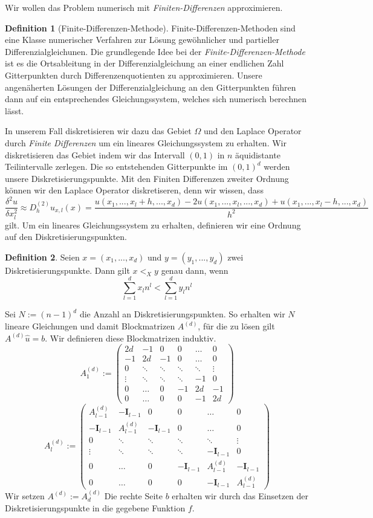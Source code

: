 \documentclass[smallheadings]{scrartcl}
\theoremstyle{definition}
\newtheorem{definition}{Definition}[section]
\begin{document}
		Wir wollen das Problem numerisch mit \textit{Finiten-Differenzen} approximieren.
		\begin{definition}[Finite-Differenzen-Methode]
		Finite-Differenzen-Methoden sind eine Klasse numerischer Verfahren zur Lösung gewöhnlicher und partieller Differenzialgleichunen.		
		Die grundlegende Idee bei der \textit{Finite-Differenzen-Methode} ist es die Ortsableitung in der Differenzialgleichung an einer endlichen Zahl Gitterpunkten durch Differenzenquotienten zu approximieren. Unsere angenäherten Lösungen der Differenzialgleichung an den Gitterpunkten führen dann auf ein entsprechendes Gleichungssystem, welches sich numerisch berechnen lässt.
		\end{definition}
		In unserem Fall diskretisieren wir dazu das Gebiet $\Omega$ und den Laplace Operator durch \textit{Finite Differenzen} um ein lineares Gleichungssystem zu erhalten.
		 Wir diskretisieren das Gebiet indem wir das Intervall $(0,1)$ in $n$ äquidistante Teilintervalle zerlegen. Die so entstehenden Gitterpunkte im $(0,1)^d$ werden unsere Diskretisierungspunkte. Mit den Finiten Differenzen zweiter Ordnung können wir den Laplace Operator diskretiseren, denn wir wissen, dass 
		$$\frac{\delta^2u}{\delta x_l^2} \approx D_h^{(2)} u_{x,l}(x) =\frac{u(x_1,...,x_l+h,...,x_d) - 2u(x_1,...,x_l,...,x_d) + u(x_1,...,x_l-h,...,x_d)}{h^2}$$
		gilt. 
		Um ein lineares Gleichungssystem zu erhalten, definieren wir eine Ordnung auf den Diskretisierungspunkten.
		\begin{definition}
		Seien $x=(x_1,...,x_d)$ und $y=(y_1,...,y_d)$ zwei Diskretisierungspunkte. Dann gilt $x <_X y$ genau dann, wenn
		$$\sum_{l=1}^dx_ln^l<\sum_{l=1}^dy_ln^l$$
		\end{definition}
		Sei $N:=(n-1)^d$ die Anzahl an Diskretisierungspunkten.
		So erhalten wir $N$ lineare Gleichungen und damit Blockmatrizen $A^{(d)}$, für die zu lösen gilt $A^{(d)}\hat{u}=b$. Wir definieren diese Blockmatrizen induktiv.
		$$A^{(d)}_{1} := \begin{pmatrix}     2d & -1 & 0 & 0 &\dots&0 \\    -1 & 2d & -1 & 0&\dots&0 \\    0&\ddots&\ddots&\ddots&\ddots&\vdots\\    \vdots & \ddots &\ddots&\ddots&-1&0 \\    0 & \dots&0&-1&2d&-1\\     0&  \dots&0&0&-1&2d    \end{pmatrix}$$
		$$A^{(d)}_{l} := \begin{pmatrix}     A^{(d)}_{l-1} & -\mathbf{I}_{l-1} & 0 & 0 &\dots&0 \\    -\mathbf{I}_{l-1} & A^{(d)}_{l-1} & -\mathbf{I}_{l-1} & 0&\dots&0 \\    0&\ddots&\ddots&\ddots&\ddots&\vdots\\    \vdots & \ddots &\ddots&\ddots&-\mathbf{I}_{l-1}&0 \\    0 & \dots&0&-\mathbf{I}_{l-1}&A^{(d)}_{l-1}&-\mathbf{I}_{l-1}\\     0&  \dots&0&0&-\mathbf{I}_{l-1}&A^{(d)}_{l-1}    \end{pmatrix}$$
		Wir setzen $A^{(d)}:=A^{(d)}_d$ Die rechte Seite $b$ erhalten wir durch das Einsetzen der Diskretisierungspunkte in die gegebene Funktion $f$. 
\end{document}
